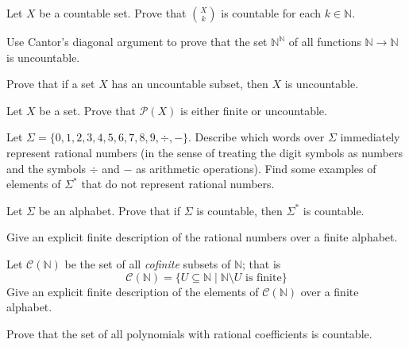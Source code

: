 \begin{exercise} \label{exFiniteSubsetsCountableFixedSize}
Let $X$ be a countable set. Prove that $\binom{X}{k}$ is countable for each $k \in \mathbb{N}$.
\end{exercise}


\begin{exercise}
Use Cantor's diagonal argument to prove that the set $\mathbb{N}^{\mathbb{N}}$ of all functions $\mathbb{N} \to \mathbb{N}$ is uncountable.
\end{exercise}

\begin{exercise}
Prove that if a set $X$ has an uncountable subset, then $X$ is uncountable.
\end{exercise}

\begin{exercise}
\label{exPowerSetFiniteOrUncountable}
Let $X$ be a set. Prove that $\mathcal{P}(X)$ is either finite or uncountable.
\end{exercise}


\begin{exercise}
Let $\Sigma = \{ 0,1,2,3,4,5,6,7,8,9,{\div},{-} \}$. Describe which words over $\Sigma$ immediately represent rational numbers (in the sense of treating the digit symbols as numbers and the symbols $\div$ and $-$ as arithmetic operations). Find some examples of elements of $\Sigma^*$ that do not represent rational numbers.
\end{exercise}

\begin{exercise}
Let $\Sigma$ be an alphabet. Prove that if $\Sigma$ is countable, then $\Sigma^*$ is countable.
\end{exercise}

\begin{exercise}
\label{exFiniteDescriptionOfQ}
Give an explicit finite description of the rational numbers over a finite alphabet.
\end{exercise}

\begin{exercise}
\label{exFiniteDescriptionOfCofiniteSubsetsOfN}
Let $\mathcal{C}(\mathbb{N})$ be the set of all \textit{cofinite} subsets of $\mathbb{N}$; that is
\[ \mathcal{C}(\mathbb{N}) = \{ U \subseteq \mathbb{N} \mid \mathbb{N} \setminus U \text{ is finite} \} \]
Give an explicit finite description of the elements of $\mathcal{C}(\mathbb{N})$ over a finite alphabet.
\end{exercise}


\begin{exercise}
Prove that the set of all polynomials with rational coefficients is countable.
\end{exercise}

